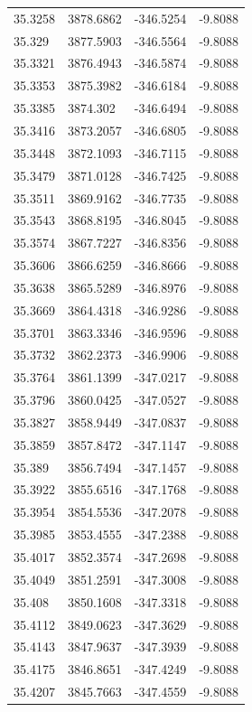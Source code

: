 \begin{table}[H]
\begin{tabular}{llll}
35.3258 & 3878.6862 & -346.5254 & -9.8088 \\
35.329 & 3877.5903 & -346.5564 & -9.8088 \\
35.3321 & 3876.4943 & -346.5874 & -9.8088 \\
35.3353 & 3875.3982 & -346.6184 & -9.8088 \\
35.3385 & 3874.302 & -346.6494 & -9.8088 \\
35.3416 & 3873.2057 & -346.6805 & -9.8088 \\
35.3448 & 3872.1093 & -346.7115 & -9.8088 \\
35.3479 & 3871.0128 & -346.7425 & -9.8088 \\
35.3511 & 3869.9162 & -346.7735 & -9.8088 \\
35.3543 & 3868.8195 & -346.8045 & -9.8088 \\
35.3574 & 3867.7227 & -346.8356 & -9.8088 \\
35.3606 & 3866.6259 & -346.8666 & -9.8088 \\
35.3638 & 3865.5289 & -346.8976 & -9.8088 \\
35.3669 & 3864.4318 & -346.9286 & -9.8088 \\
35.3701 & 3863.3346 & -346.9596 & -9.8088 \\
35.3732 & 3862.2373 & -346.9906 & -9.8088 \\
35.3764 & 3861.1399 & -347.0217 & -9.8088 \\
35.3796 & 3860.0425 & -347.0527 & -9.8088 \\
35.3827 & 3858.9449 & -347.0837 & -9.8088 \\
35.3859 & 3857.8472 & -347.1147 & -9.8088 \\
35.389 & 3856.7494 & -347.1457 & -9.8088 \\
35.3922 & 3855.6516 & -347.1768 & -9.8088 \\
35.3954 & 3854.5536 & -347.2078 & -9.8088 \\
35.3985 & 3853.4555 & -347.2388 & -9.8088 \\
35.4017 & 3852.3574 & -347.2698 & -9.8088 \\
35.4049 & 3851.2591 & -347.3008 & -9.8088 \\
35.408 & 3850.1608 & -347.3318 & -9.8088 \\
35.4112 & 3849.0623 & -347.3629 & -9.8088 \\
35.4143 & 3847.9637 & -347.3939 & -9.8088 \\
35.4175 & 3846.8651 & -347.4249 & -9.8088 \\
35.4207 & 3845.7663 & -347.4559 & -9.8088 \\

\end{tabular}
\end{table}
